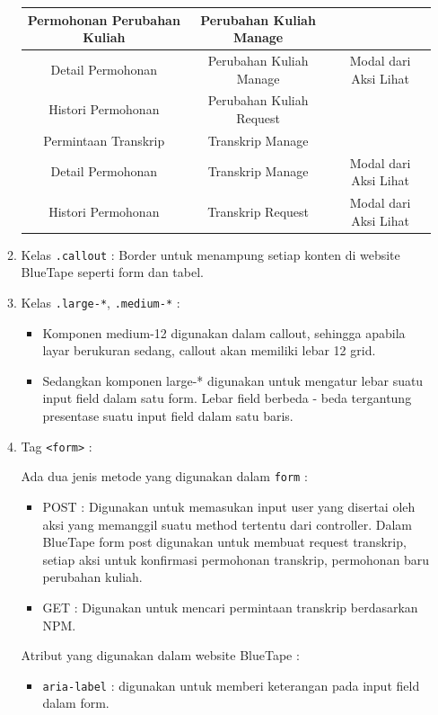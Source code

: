 \documentclass[a4paper,twoside]{article}
\begin{document}
\begin{enumerate}
\begin{enumerate}
\begin{center}
\begin{tabular}{||c | c | c||}
					\hline
					Permohonan Perubahan Kuliah &  Perubahan Kuliah Manage &\\
					\hline
					Detail Permohonan  &  Perubahan Kuliah Manage & Modal dari Aksi Lihat\\
					\hline
					Histori Permohonan &  Perubahan Kuliah Request & \\
					\hline
					Permintaan Transkrip &  Transkrip Manage &\\
					\hline
					Detail Permohonan &   Transkrip Manage & Modal dari Aksi Lihat\\
					\hline
					Histori Permohonan &  Transkrip Request & Modal dari Aksi Lihat\\
					\hline	
				\end{tabular}
			\end{center}	
			\item Kelas \colorbox{mygray}{\texttt{.callout}} : Border untuk menampung setiap konten di website BlueTape seperti form dan tabel. 
			\item Kelas \colorbox{mygray}{\texttt{.large-*}}, \colorbox{mygray}{\texttt{.medium-*}} :
			\begin{itemize}
				\item Komponen medium-12 digunakan dalam callout, sehingga apabila layar berukuran sedang, callout akan memiliki lebar 12 grid.
				\item Sedangkan komponen  large-* digunakan untuk mengatur lebar suatu input field dalam satu form. Lebar field berbeda - beda tergantung presentase suatu input field dalam satu baris.
			\end{itemize} 
			\item Tag \colorbox{mygray}{\texttt{<form>}} : \par
			Ada dua jenis metode yang digunakan dalam \texttt{form} :
			\begin{itemize}
				\item POST : Digunakan untuk memasukan input user yang disertai oleh aksi yang memanggil suatu method tertentu dari controller. Dalam BlueTape form post digunakan untuk membuat request transkrip, setiap aksi untuk konfirmasi permohonan transkrip, permohonan baru  perubahan kuliah.
				\item GET : Digunakan untuk mencari permintaan transkrip berdasarkan NPM.
			\end{itemize}	  
			Atribut yang digunakan dalam website BlueTape : 	
			\begin{itemize}
				\item \colorbox{mygray}{\texttt{aria-label}} : digunakan untuk memberi keterangan pada input field dalam form.

\end{itemize}
\end{enumerate}
\end{enumerate}
\end{document}
